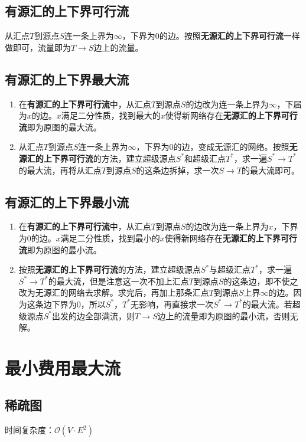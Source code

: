 \documentclass[a4paper,openany]{book}
\newcommand{\cppcode}[1]{
    \inputminted[mathescape,
    			 tabsize=4,
    			 linenos,
    			 frame=single,
    			 framesep=2mm,
    			 breakaftergroup=true,
    			 breakautoindent=true,
    			 breakbytoken=true,
    			 breaklines=true
    ]{cpp}{#1}
}
\begin{document}
\begin{spacing}{1.0}
		\subsection{有源汇的上下界可行流}
			从汇点$T$到源点$S$连一条上界为$\infty$，下界为$0$的边。按照\textbf{无源汇的上下界可行流}一样做即可，流量即为$T \rightarrow S$边上的流量。
		\subsection{有源汇的上下界最大流}
			\begin{enumerate}
				\item 在\textbf{有源汇的上下界可行流}中，从汇点$T$到源点$S$的边改为连一条上界为$\infty$，下届为$x$的边。$x$满足二分性质，找到最大的$x$使得新网络存在\textbf{无源汇的上下界可行流}即为原图的最大流。
				\item 从汇点$T$到源点$S$连一条上界为$\infty$，下界为$0$的边，变成无源汇的网络。按照\textbf{无源汇的上下界可行流}的方法，建立超级源点$S^*$和超级汇点$T^*$，求一遍$S^* \rightarrow T^*$的最大流，再将从汇点$T$到源点$S$的这条边拆掉，求一次$S \rightarrow T$的最大流即可。
			\end{enumerate}
		\subsection{有源汇的上下界最小流}
			\begin{enumerate}
				\item 在\textbf{有源汇的上下界可行流}中，从汇点$T$到源点$S$的边改为连一条上界为$x$，下界为$0$的边。$x$满足二分性质，找到最小的$x$使得新网络存在\textbf{无源汇的上下界可行流}即为原图的最小流。
				\item 按照\textbf{无源汇的上下界可行流}的方法，建立超级源点$S^*$与超级汇点$T^*$，求一遍$S^* \rightarrow T^*$的最大流，但是注意这一次不加上汇点$T$到源点$S$的这条边，即不使之改为无源汇的网络去求解。求完后，再加上那条汇点$T$到源点$S$上界$\infty$的边。因为这条边下界为$0$，所以$S^*$，$T^*$无影响，再直接求一次$S^* \rightarrow T^*$的最大流。若超级源点$S^*$出发的边全部满流，则$T \rightarrow S$边上的流量即为原图的最小流，否则无解。
			\end{enumerate}
		\section{最小费用最大流}
		\subsection{稀疏图}
			时间复杂度：$\mathcal{O}(V \cdot E^2)$
			\cppcode{Source/Graph-Theory/Minimum-Cost-Flow-Spfa.cpp}

\end{spacing}
\end{document}

